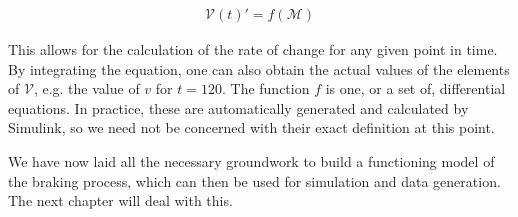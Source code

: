 \begin{align*}
{\mathcal{V}}(t)' = f ( {\mathcal{M}} )
\end{align*}

\noindent
This allows for the calculation of the rate of change for any given point in time. By integrating the equation, one can also obtain the actual values of the elements of ${\mathcal{V}}$, e.g. the value of $v$ for $t=120$. The function $f$ is one, or a set of, differential equations. In practice, these are automatically generated and calculated by Simulink, so we need not be concerned with their exact definition at this point.
\bigskip
\par\noindent
We have now laid all the necessary groundwork to build a functioning model of the braking process, which can then be used for simulation and data generation. The next chapter will deal with this.